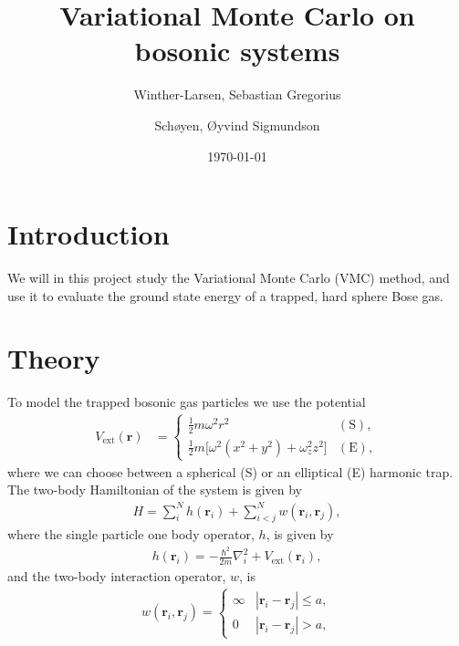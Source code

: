 \documentclass[
    a4paper, aps, twocolumn, floatfix, superscriptaddress]{revtex4-1}
\newcommand{\vf}{\mathbf}
\newcommand{\1}{\mathds{1}}
\newcommand{\half}{\frac{1}{2}}
\begin{document}
\title{Variational Monte Carlo on bosonic systems}
\author{Winther-Larsen, Sebastian Gregorius}
\author{Schøyen, Øyvind Sigmundson}
\date{\today}

\maketitle

\section{Introduction}
    We will in this project study the Variational Monte Carlo (VMC) method, and
    use it to evaluate the ground state energy of a trapped, hard sphere Bose
    gas.

\section{Theory}
    To model the trapped bosonic gas particles we use the potential
    \begin{align}
        V_{\text{ext}}(\vf{r})
        &=
        \begin{cases}
            \half m\omega^2r^2 & (\text{S}), \\
            \half m \bigl[
                \omega^2(x^2 + y^2) + \omega_z^2z^2
            \bigr] & (\text{E}),
        \end{cases}
    \end{align}
    where we can choose between a spherical (S) or an elliptical (E) harmonic
    trap. The two-body Hamiltonian of the system is given by
    \begin{align}
        H = \sum_{i}^{N}h(\vf{r}_i) + \sum_{i < j}^{N}w(\vf{r}_i, \vf{r}_j),
    \end{align}
    where the single particle one body operator, $h$, is given by
    \begin{align}
        h(\vf{r}_i) = -\frac{\hbar^2}{2m}\nabla_i^2
        + V_{\text{ext}}(\vf{r}_i),
    \end{align}
    and the two-body interaction operator, $w$, is
    \begin{align}
        w(\vf{r}_i, \vf{r}_j)
        = \begin{cases}
            \infty & |\vf{r}_i - \vf{r}_j| \leq a, \\
            0 & |\vf{r}_i - \vf{r}_j| > a,
        \end{cases}
    \end{align}
\end{document}
